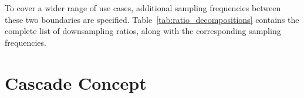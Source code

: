 To cover a  wider range of use cases, additional  sampling frequencies between
these   two  boundaries   are  specified. Table~\ref{tab:ratio_decompositions}
contains  the   complete  list   of  downsampling   ratios,  along   with  the
corresponding sampling frequencies.

\begin{table}
    \centering
    \caption[Downsampling Ratios, Decompositions, and Target Frequencies]{
        The chosen downsampling ratios, their prime factor decompositions, the
        downsampling  ratios  distributed  across stages,  and  the  resultant
        sampling rates%
    }
    \label{tab:ratio_decompositions}
\end{table}


%
%
\section{Cascade Concept} %
\label{sec:cascade_concept}

